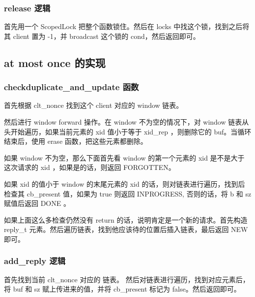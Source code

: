 \documentclass[10pt]{article}
\begin{document}
\begin{CJK}{UTF8}{gbsn}
\subsubsection{release 逻辑}
首先用一个 ScopedLock 把整个函数锁住。然后在 locks 中找这个锁，找到之后将其 client 置为 -1，并 broadcast 这个锁的 cond，然后返回即可。

\subsection{at most once 的实现}
\subsubsection{checkduplicate\_and\_update 函数}
首先根据 clt\_nonce 找到这个 client 对应的 window 链表。

然后进行 window forward 操作。在 window 不为空的情况下，对 window 链表从头开始遍历，如果当前元素的 xid 值小于等于 xid\_rep ，则删除它的 buf。当循环结束后，使用 erase 函数，把这些元素都删除。

如果 window 不为空，那么下面首先看 window 的第一个元素的 xid 是不是大于 这次请求的 xid ，如果是的话，则返回 FORGOTTEN。

如果 xid 的值小于 window 的末尾元素的 xid 的话，则对链表进行遍历，找到后检查其 cb\_present 值，如果为 true 则返回 INPROGRESS, 否则的话，将 b 和 sz 赋值后返回 DONE
。

如果上面这么多检查仍然没有 return 的话，说明肯定是一个新的请求。首先构造 reply\_t 元素。然后遍历链表，找到他应该待的位置后插入链表，最后返回 NEW 即可。

\subsubsection{add\_reply 逻辑}
首先找到当前 clt\_nonce 对应的 链表。
然后对链表进行遍历，找到对应元素后，将 buf 和 sz 赋上传进来的值，并将 cb\_present 标记为 false。然后返回即可。

\end{CJK}
\end{document}
